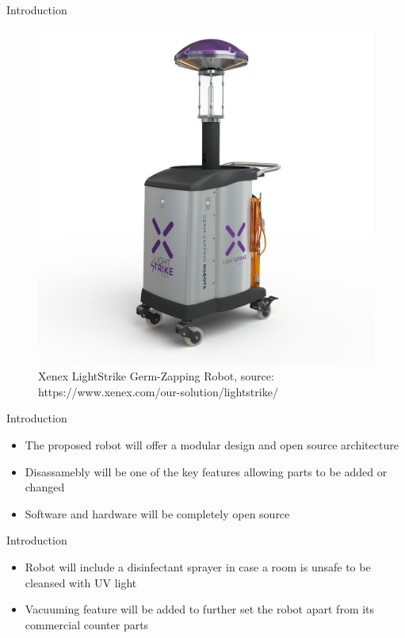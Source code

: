 \documentclass{beamer}
\begin{document}
\begin{frame}{Introduction}{}
\begin{figure}
	\centering
	\includegraphics[scale=0.15]{figs/img/xenexLightstrike}
	\caption{Xenex LightStrike Germ-Zapping Robot, source: https://www.xenex.com/our-solution/lightstrike/}
\end{figure}
\end{frame}

\begin{frame}{Introduction}{}
\begin{itemize}
	\item The proposed robot will offer a modular design and open source architecture
	\item Disassamebly will be one of the key features allowing parts to be added or changed
	\item Software and hardware will be completely open source
\end{itemize}
\end{frame}

\begin{frame}{Introduction}{}
\begin{itemize}
	\item Robot will include a disinfectant sprayer in case a room is unsafe to be cleansed with UV light
	\item Vacuuming feature will be added to further set the robot apart from its commercial counter parts
\end{itemize}
\end{frame}
\end{document}
